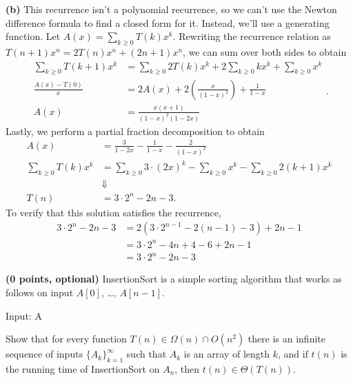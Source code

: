 \documentclass[11pt, letterpaper]{article}
\begin{document}
\begin{solution}
   \textbf{(b)} This recurrence isn't a polynomial recurrence, so we can't use the Newton difference formula to find a closed form for it. Instead, we'll use a generating function. Let $A(x)=\sum_{k\geq 0}T(k)x^k$. Rewriting the recurrence relation as $T(n+1)x^n=2T(n)x^n+(2n+1)x^n$, we can sum over both sides to obtain
   \[
     \begin{aligned}
         \sum_{k\geq 0} T(k+1)x^k &= \sum_{k\geq 0} 2T(k)x^k + 2\sum_{k\geq 0} kx^k + \sum_{k\geq 0}x^k\\
         \frac{A(x)-T(0)}{x} &= 2 A(x) + 2\left(\frac{x}{(1-x)^2}\right)+\frac{1}{1-x}\\
         A(x)&=\frac{x(x+1)}{(1-x)^2(1-2x)}
     \end{aligned}
   .\]   
   Lastly, we perform a partial fraction decomposition to obtain
   \[
    \begin{aligned}
        A(x)&=\frac{3}{1-2x}-\frac{1}{1-x}-\frac{2}{(1-x)^2}\\
        \sum_{k\geq 0}T(k)x^k&=\sum_{k\geq 0}3\cdot(2x)^k-\sum_{k\geq 0}x^k-\sum_{k\geq 0}2(k+1)x^k\\
        &\Downarrow\\
        T(n)&= 3\cdot 2^n-2n-3.
    \end{aligned}
   \] 
   To verify that this solution satisfies the recurrence, 
   \[
    \begin{aligned}
        3\cdot 2^n-2n-3&=2\left(3\cdot 2^{n-1}-2(n-1)-3\right)+2n-1\\
        &=3\cdot 2^n-4n+4-6+2n-1\\
        &=3\cdot 2^n-2n-3
    \end{aligned}
   \] 
\end{solution}

\pagebreak
\begin{problem} {\bf (0 points, optional)}
    InsertionSort is a simple sorting algorithm that works as follows on input $A[0]$, \ldots, $A[n-1]$.
    
    \begin{solution}
        \hr
        \begin{algorithm}\noindent
            \begin{algorithmic}
                \STATE Input: A
                    \ENDWHILE
                \ENDFOR
            \end{algorithmic}
        \end{algorithm}
        \hr
    \end{solution}
    
    Show that for every function $T(n) \in \Omega(n) \cap O(n^2)$
    there is an infinite sequence of inputs $\{A_k\}_{k=1}^{\infty}$
    such that $A_k$ is an array of length $k$, and if $t(n)$ is the running time of
    InsertionSort on $A_n$, then $t(n) \in \Theta(T(n))$. 
\end{problem}
\end{document}

